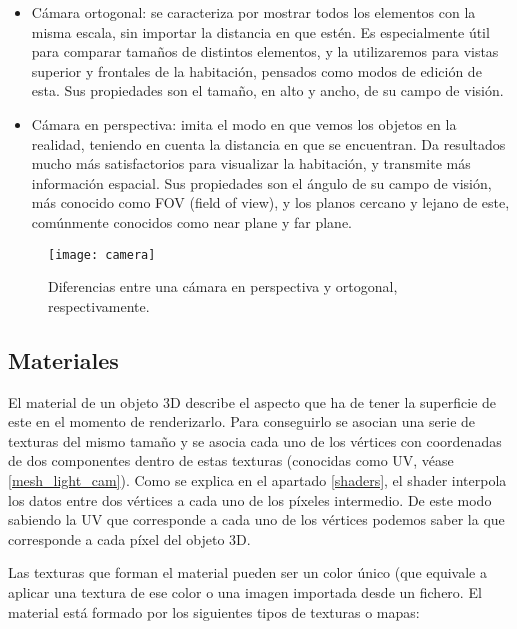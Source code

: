 \begin{itemize}
    \item Cámara ortogonal: se caracteriza por mostrar todos los elementos con la misma escala, sin importar la distancia en que estén. Es especialmente útil para comparar tamaños de distintos elementos, y la utilizaremos para vistas superior y frontales de la habitación, pensados como modos de edición de esta. Sus propiedades son el tamaño, en alto y ancho, de su campo de visión.
    \item Cámara en perspectiva: imita el modo en que vemos los objetos en la realidad, teniendo en cuenta la distancia en que se encuentran. Da resultados mucho más satisfactorios para visualizar la habitación, y transmite más información espacial. Sus propiedades son el ángulo de su campo de visión, más conocido como FOV (field of view), y los planos cercano y lejano de este, comúnmente conocidos como near plane y far plane.
\end{itemize}

\begin{figure}[H]
    \centering
    \texttt{[image: camera]}
    \caption{Diferencias entre una cámara en perspectiva y ortogonal, respectivamente.}
    \label{fig:camera}
\end{figure}

\subsection{Materiales}
\label{materials}
El material de un objeto 3D describe el aspecto que ha de tener la superficie de este en el momento de renderizarlo. Para conseguirlo se asocian una serie de texturas del mismo tamaño y se asocia cada uno de los vértices con coordenadas de dos componentes dentro de estas texturas (conocidas como UV, véase \ref{mesh_light_cam}). Como se explica en el apartado \ref{shaders}, el shader interpola los datos entre dos vértices a cada uno de los píxeles intermedio. De este modo sabiendo la UV que corresponde a cada uno de los vértices podemos saber la que corresponde a cada píxel del objeto 3D.

Las texturas que forman el material pueden ser un color único (que equivale a aplicar una textura de ese color o una imagen importada desde un fichero. El material está formado por los siguientes tipos de texturas o mapas:

